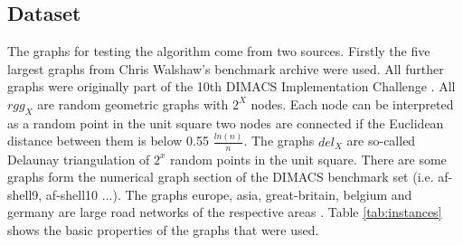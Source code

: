 \documentclass[acmsmall,nonacm,screen,review]{acmart}
\begin{document}
\subsection{Dataset}
The graphs for testing the algorithm come from two sources. Firstly the five largest
graphs from Chris Walshaw's benchmark archive \cite{soper2004combined} were used. 
All further graphs were originally part of the 10th DIMACS Implementation
Challenge \cite{benchmarksfornetworksanalysis}. All $rgg_X$ are random geometric graphs with
$2^X$ nodes. Each node can be interpreted as a random point in the unit square two nodes are connected
if the Euclidean distance between them is below 0.55 $\frac{ln(n)}{n}$. The graphs $del_X$ are so-called
Delaunay triangulation of $2^x$ random points in the unit square. There are some graphs form the numerical
graph section of the DIMACS benchmark set (i.e. af-shell9, af-shell10 ...). The graphs europe, asia, 
great-britain, belgium and germany are large road networks of the respective areas \cite{DSSW09}. 
Table \ref{tab:instances} shows the basic properties of the graphs that were used.
\end{document}

